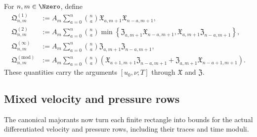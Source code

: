 \begin{definition}
\label{def:qc-closed-pressure-majorants}
For \(n,m\in\Nzero\), define
\begin{align}
 \mathfrak Q^{(1)}_{n,m}
 &:={}
 A_m\sum_{a=0}^{n}\binom na
 \mathfrak X_{a,m+1}\mathfrak X_{n-a,m+1},
 \label{eq:qc-Q1}\\
 \mathfrak Q^{(2)}_{n,m}
 &:={}
 A_m\sum_{a=0}^{n}\binom na
 \min\left\{
 \mathfrak Z_{a,m+1}\mathfrak X_{n-a,m+1},
 \mathfrak X_{a,m+1}\mathfrak Z_{n-a,m+1}
 \right\},
 \label{eq:qc-Q2}\\
 \mathfrak Q^{(\infty)}_{n,m}
 &:={}
 A_m\sum_{a=0}^{n}\binom na
 \mathfrak Z_{a,m+1}\mathfrak Z_{n-a,m+1},
 \label{eq:qc-Qinfty}\\
 \mathfrak Q^{(\mathrm{mod})}_{n,m}
 &:={}
 A_m\sum_{a=0}^{n}\binom na
 \left(
 \mathfrak X_{a+1,m+1}\mathfrak Z_{n-a,m+1}
 +\mathfrak Z_{a,m+1}\mathfrak X_{n-a+1,m+1}
 \right).
 \label{eq:qc-Qmod}
\end{align}
These quantities carry the arguments \([u_0,\nu;T]\) through
\(\mathfrak X\) and \(\mathfrak Z\).
\end{definition}

\subsection{Mixed velocity and pressure rows}

The canonical majorants now turn each finite rectangle into bounds for the
actual differentiated velocity and pressure rows, including their traces and
time moduli.


